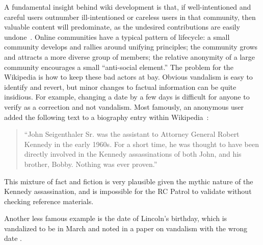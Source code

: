 A fundamental insight behind wiki development is that,
if well-intentioned and careful users outnumber ill-intentioned
or careless users in that community, then valuable content will predominate,
as the undesired contributions are easily undone~\cite{Wikis01}.
Online communities have a typical pattern of lifecycle:
a small community develops and rallies around unifying principles;
the community grows and attracts a more diverse group of members;
the relative anonymity of a large community encourages
a small ``anti-social element.''
The problem for the Wikipedia is how to keep these bad actors at bay.
Obvious vandalism is easy to identify and revert,
but minor changes to factual information can be quite insidious.
For example, changing a date by a few days is difficult for anyone
to verify as a correction and not vandalism.
Most famously, an anonymous user added the following text to a biography entry
within Wikipedia~\cite{Seigenthaler05,NewYorkTimes05a,NewYorkTimes05b}:
\begin{quote}
``John Seigenthaler Sr. was the assistant to
Attorney General Robert Kennedy in the early 1960s.
For a short time, he was thought to have been directly involved
in the Kennedy assassinations of both John, and his brother, Bobby.
Nothing was ever proven.''
\end{quote}
This mixture of fact and fiction is very plausible given the
mythic nature of the Kennedy assassination, and is impossible
for the RC Patrol to validate without checking reference materials.

Another less famous example is the date of Lincoln's birthday,
which is vandalized to be in March  and noted in a paper on vandalism with the wrong
date .


